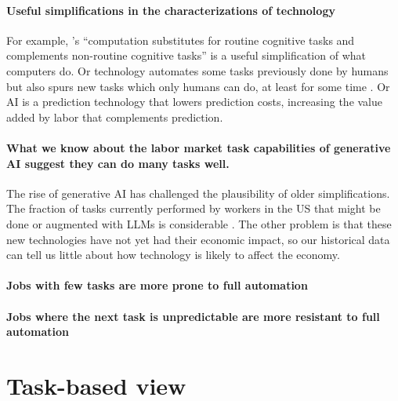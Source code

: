\documentclass{article}
\begin{document}

\paragraph{Useful simplifications in the characterizations of technology}

For example, \cite{autor2003skill}'s ``computation substitutes for routine cognitive tasks and complements non-routine cognitive tasks'' is a useful simplification of what computers do. 
Or technology automates some tasks previously done by humans but also spurs new tasks which only humans can do, at least for some time \citep{acemoglu2019}. 
Or AI is a prediction technology that lowers prediction costs, increasing the value added by labor that complements prediction. 

\paragraph{What we know about the labor market task capabilities of generative AI suggest they can do many tasks well.}
The rise of generative AI has challenged the plausibility of older simplifications.
The fraction of tasks currently performed by workers in the US that might be done or augmented with LLMs is considerable \citep{eloundou2023gpts}.
The other problem is that these new technologies have not yet had their economic impact, so our historical data can tell us little about how technology is likely to affect the economy. 

\paragraph{Jobs with few tasks are more prone to full automation}

\paragraph{Jobs where the next task is unpredictable are more resistant to full automation}

\section{Task-based view}
\end{document}
